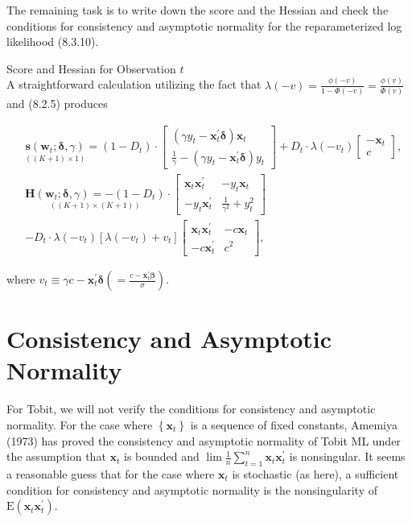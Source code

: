 \documentclass[10pt]{article}
\begin{document}
The remaining task is to write down the score and the Hessian and check the conditions for consistency and asymptotic normality for the reparameterized log likelihood (8.3.10).

Score and Hessian for Observation $t$\\
A straightforward calculation utilizing the fact that $\lambda(-v)=\frac{\phi(-v)}{1-\Phi(-v)}=\frac{\phi(v)}{\Phi(v)}$ and (8.2.5) produces


\begin{align*}
& \underset{((K+1) \times 1)}{\mathbf{s}\left(\mathbf{w}_{t} ; \boldsymbol{\delta}, \gamma\right)}=\left(1-D_{t}\right) \cdot {\left[\begin{array}{c}
\left(\gamma y_{t}-\mathbf{x}_{t}^{\prime} \boldsymbol{\delta}\right) \mathbf{x}_{t} \\
\frac{1}{\gamma}-\left(\gamma y_{t}-\mathbf{x}_{t}^{\prime} \boldsymbol{\delta}\right) y_{t}
\end{array}\right]+D_{t} \cdot \lambda\left(-v_{t}\right)\left[\begin{array}{c}
-\mathbf{x}_{t} \\
c
\end{array}\right], }  \tag{8.3.11}\\
& \underset{((K+1) \times(K+1))}{\mathbf{H}\left(\mathbf{w}_{t} ; \boldsymbol{\delta}, \gamma\right)=-\left(1-D_{t}\right)} \cdot\left[\begin{array}{cc}
\mathbf{x}_{t} \mathbf{x}_{t}^{\prime} & -y_{t} \mathbf{x}_{t} \\
-y_{t} \mathbf{x}_{t}^{\prime} & \frac{1}{\gamma^{2}}+y_{t}^{2}
\end{array}\right] \\
&-D_{t} \cdot \lambda\left(-v_{t}\right)\left[\lambda\left(-v_{t}\right)+v_{t}\right]\left[\begin{array}{cc}
\mathbf{x}_{t} \mathbf{x}_{t}^{\prime} & -c \mathbf{x}_{t} \\
-c \mathbf{x}_{t}^{\prime} & c^{2}
\end{array}\right], \tag{8.3.12}
\end{align*}


where $v_{t} \equiv \gamma c-\mathbf{x}_{t}^{\prime} \boldsymbol{\delta}\left(=\frac{c-\mathbf{x}_{t}^{\prime} \boldsymbol{\beta}}{\sigma}\right)$.

\section*{Consistency and Asymptotic Normality}
For Tobit, we will not verify the conditions for consistency and asymptotic normality. For the case where $\left\{\mathbf{x}_{t}\right\}$ is a sequence of fixed constants, Amemiya (1973) has proved the consistency and asymptotic normality of Tobit ML under the assumption that $\mathbf{x}_{t}$ is bounded and $\lim \frac{1}{n} \sum_{t=1}^{n} \mathbf{x}_{t} \mathbf{x}_{t}^{\prime}$ is nonsingular. It seems a reasonable guess that for the case where $\mathbf{x}_{t}$ is stochastic (as here), a sufficient condition for consistency and asymptotic normality is the nonsingularity of $\mathrm{E}\left(\mathbf{x}_{t} \mathbf{x}_{t}^{\prime}\right)$.
\end{document}
